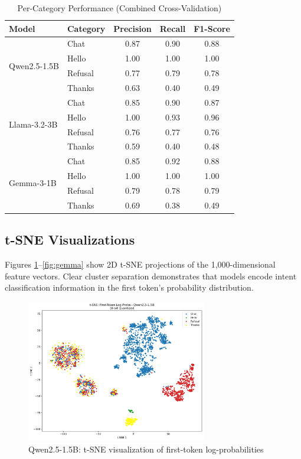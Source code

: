 \documentclass[11pt]{article}
\begin{document}
\begin{table}[H]
\centering
\caption{Per-Category Performance (Combined Cross-Validation)}
\label{tab:category}
\begin{tabular}{@{}llccc@{}}
\toprule
\textbf{Model} & \textbf{Category} & \textbf{Precision} & \textbf{Recall} & \textbf{F1-Score} \\
\midrule
\multirow{4}{*}{Qwen2.5-1.5B} & Chat & 0.87 & 0.90 & 0.88 \\
 & Hello & 1.00 & 1.00 & 1.00 \\
 & Refusal & 0.77 & 0.79 & 0.78 \\
 & Thanks & 0.63 & 0.40 & 0.49 \\
\midrule
\multirow{4}{*}{Llama-3.2-3B} & Chat & 0.85 & 0.90 & 0.87 \\
 & Hello & 1.00 & 0.93 & 0.96 \\
 & Refusal & 0.76 & 0.77 & 0.76 \\
 & Thanks & 0.59 & 0.40 & 0.48 \\
\midrule
\multirow{4}{*}{Gemma-3-1B} & Chat & 0.85 & 0.92 & 0.88 \\
 & Hello & 1.00 & 1.00 & 1.00 \\
 & Refusal & 0.79 & 0.78 & 0.79 \\
 & Thanks & 0.69 & 0.38 & 0.49 \\
\bottomrule
\end{tabular}
\end{table}

\subsection{t-SNE Visualizations}

Figures \ref{fig:qwen}--\ref{fig:gemma} show 2D t-SNE projections of the 1,000-dimensional feature vectors. Clear cluster separation demonstrates that models encode intent classification information in the first token's probability distribution.

\begin{figure}[H]
\centering
\includegraphics[width=0.7\textwidth]{tsne_Qwen2_5_1_5B_8bit.png}
\caption{Qwen2.5-1.5B: t-SNE visualization of first-token log-probabilities}
\label{fig:qwen}
\end{figure}
\end{document}
